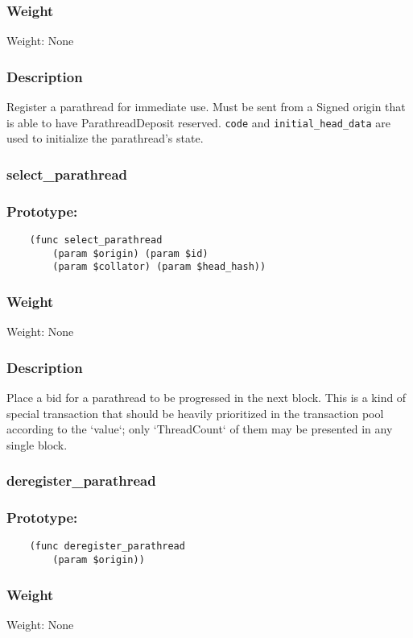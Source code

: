 \documentclass[11pt,a4paper]{article}
\begin{document}
\subsubsection*{Weight}
Weight: None
\subsubsection*{Description}
Register a parathread for immediate use. Must be sent from a Signed origin that is able to have ParathreadDeposit reserved. \verb|code| and \verb|initial_head_data| are used to initialize the parathread's state.

\subsubsection{select\_parathread}
\subsubsection*{Prototype:}
\begin{verbatim}
    (func select_parathread
        (param $origin) (param $id)
        (param $collator) (param $head_hash))
\end{verbatim}
\subsubsection*{Weight}
Weight: None
\subsubsection*{Description}
Place a bid for a parathread to be progressed in the next block. This is a kind of special transaction that should be heavily prioritized in the transaction pool according to the `value`; only `ThreadCount` of them may be presented in any single block.

\subsubsection{deregister\_parathread}
\subsubsection*{Prototype:}
\begin{verbatim}
    (func deregister_parathread
        (param $origin))
\end{verbatim}
\subsubsection*{Weight}
Weight: None
\end{document}
